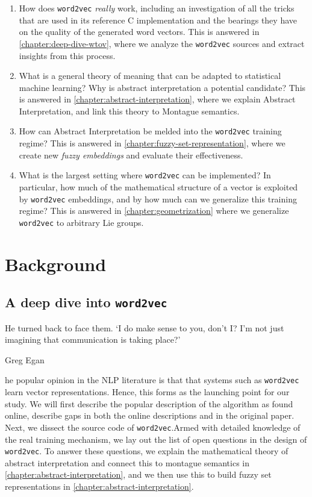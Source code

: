\documentclass[11pt]{book}
\newcommand{\wtov}{\texttt{word2vec }}
\begin{document}
\begin{enumerate}
    \item How does \texttt{word2vec} \emph{really} work, including an
        investigation of all the tricks that are used in its reference C
        implementation and the bearings they have on the quality of the
        generated word vectors. This is answered in \autoref{chapter:deep-dive-wtov},
        where we analyze the \texttt{word2vec} sources and extract insights from this process.
    \item What is a general theory of meaning that can be adapted to
        statistical machine learning? Why is abstract interpretation a
        potential candidate? This is answered in \autoref{chapter:abstract-interpretation},
        where we explain Abstract Interpretation, and link this theory to Montague semantics.
    \item How can Abstract Interpretation be melded into the \texttt{word2vec}
        training regime? This is answered in
        \autoref{chapter:fuzzy-set-representation}, where we create new
        \emph{fuzzy embeddings} and evaluate their effectiveness.
    \item What is the largest setting where \texttt{word2vec} can be
        implemented? In particular, how much of the mathematical structure of a
        vector is exploited by \texttt{word2vec} embeddings, and by how much
        can we generalize this training regime? This is answered in
        \autoref{chapter:geometrization} where we generalize \texttt{word2vec} to arbitrary Lie groups.
\end{enumerate}



\chapter{Background}
\section{A deep dive into \wtov}
\label{chapter:deep-dive-wtov}

\epigraph{He turned back to face them. ‘I do make sense to you, don’t I? I’m not just imagining that communication is taking place?'}{Greg Egan}

he popular opinion in the NLP literature
is that that systems such as \texttt{word2vec} learn
vector representations. Hence, this forms as the launching point for our study. We will
first describe the popular description of the algorithm as found online, describe
gaps in both the online descriptions and in the original paper. Next, we dissect the
source code of \texttt{word2vec}.Armed with detailed knowledge of the real
training mechanism, we lay out the list of open questions in the design of
\texttt{word2vec}. To answer these questions, we explain the mathematical
theory of abstract interpretation and connect this to montague semantics in
\autoref{chapter:abstract-interpretation}, and we then use this to build fuzzy
set representations in \autoref{chapter:abstract-interpretation}.
\end{document}
